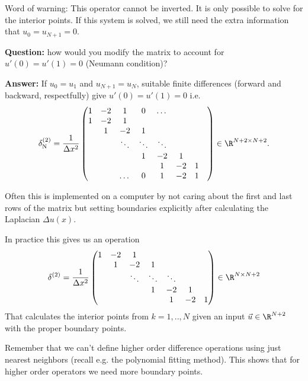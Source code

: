 \begin{frame}
	\alert{Word of warning:} This operator cannot be inverted. It is only possible to solve for the interior points. If this system is solved, we still need the extra information that $ u_0 = u_{N+1} = 0 $. 
	
	\pause
	\textbf{Question:} how would you modify the matrix to account for $ u'(0) = u'(1) = 0 $ (Neumann condition)?
	
	\pause
	\textbf{Answer:} If $ u_0 = u_1 $ and $ u_{N+1} = u_N $, suitable finite differences (forward and backward, respectfully) give $ u'(0) = u'(1) = 0 $ i.e. 
	\[ \delta^{(2)}_{\text{N}} = \frac{1}{\Delta x^2} \begin{pmatrix}
		1 & -2 & 1 & 0  & \dots & & & \\
		1 & -2 & 1  &   & &  &  \\
		& 1  & -2 & 1 &  &  & \\
		& & \ddots & \ddots & \ddots  & & \\
		& & & 1 & -2 & 1 & \\
		& & & & 1 & -2 & 1 \\
		& & \dots & 0 & 1 & -2 & 1
	\end{pmatrix} \in \R^{N+2 \times N+2}. \]
\end{frame}

\begin{frame}
	Often this is implemented on a computer by not caring about the first and last rows of the matrix but setting boundaries explicitly after calculating the Laplacian $ \Delta u(x) $.
	
	In practice this gives us an operation 
	\[ \delta^{(2)} = \frac{1}{\Delta x^2} \begin{pmatrix}
		1 & -2 & 1  &   & &  &  \\
		& 1  & -2 & 1 &  &  & \\
		& & \ddots & \ddots & \ddots  & & \\
		& & & 1 & -2 & 1 & \\
		& & & & 1 & -2 & 1 
	\end{pmatrix} \in \R^{N \times N+2} \]
	That calculates the interior points from $ k=1,..,N $ given an input $ \vec{u} \in \R^{N+2} $ with the proper boundary points. 
	
	Remember that we can't define higher order difference operations using just nearest neighbors (recall e.g. the polynomial fitting method). This shows that for higher order operators we need more boundary points. 
\end{frame}


